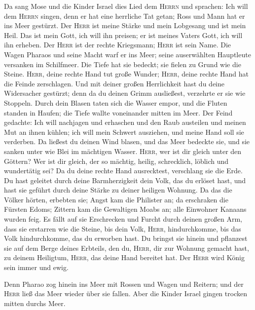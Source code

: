  Da sang Mose und die Kinder Israel dies Lied dem
\textsc{Herrn} und sprachen: Ich will dem \textsc{Herrn} singen, denn er
hat eine herrliche Tat getan; Ross und Mann hat er ins Meer gestürzt.
 Der \textsc{Herr} ist meine Stärke und mein Lobgesang und
ist mein Heil. Das ist mein Gott, ich will ihn preisen; er ist meines
Vaters Gott, ich will ihn erheben.  Der \textsc{Herr} ist
der rechte Kriegsmann; \textsc{Herr} ist sein Name.  Die
Wagen Pharaos und seine Macht warf er ins Meer; seine auserwählten
Hauptleute versanken im Schilfmeer.  Die Tiefe hat sie
bedeckt; sie fielen zu Grund wie die Steine. 
\textsc{Herr}, deine rechte Hand tut große Wunder; \textsc{Herr}, deine
rechte Hand hat die Feinde zerschlagen.  Und mit deiner
großen Herrlichkeit hast du deine Widersacher gestürzt; denn da du
deinen Grimm ausließest, verzehrte er sie wie Stoppeln. 
Durch dein Blasen taten sich die Wasser empor, und die Fluten standen in
Haufen; die Tiefe wallte voneinander mitten im Meer.  Der
Feind gedachte: Ich will nachjagen und erhaschen und den Raub austeilen
und meinen Mut an ihnen kühlen; ich will mein Schwert ausziehen, und
meine Hand soll sie verderben.  Da ließest du deinen Wind
blasen, und das Meer bedeckte sie, und sie sanken unter wie Blei im
mächtigen Wasser.  \textsc{Herr}, wer ist dir gleich
unter den Göttern? Wer ist dir gleich, der so mächtig, heilig,
schrecklich, löblich und wundertätig sei?  Da du deine
rechte Hand ausrecktest, verschlang sie die Erde.  Du
hast geleitet durch deine Barmherzigkeit dein Volk, das du erlöset hast,
und hast sie geführt durch deine Stärke zu deiner heiligen Wohnung.
 Da das die Völker hörten, erbebten sie; Angst kam die
Philister an;  da erschraken die Fürsten Edoms; Zittern
kam die Gewaltigen Moabs an; alle Einwohner Kanaans wurden feig.
 Es fällt auf sie Erschrecken und Furcht durch deinen
großen Arm, dass sie erstarren wie die Steine, bis dein Volk,
\textsc{Herr}, hindurchkomme, bis das Volk hindurchkomme, das du
erworben hast.  Du bringst sie hinein und pflanzest sie
auf dem Berge deines Erbteils, den du, \textsc{Herr}, dir zur Wohnung
gemacht hast, zu deinem Heiligtum, \textsc{Herr}, das deine Hand
bereitet hat.  Der \textsc{Herr} wird König sein immer
und ewig.

 Denn Pharao zog hinein ins Meer mit Rossen und Wagen und
Reitern; und der \textsc{Herr} ließ das Meer wieder über sie fallen.
Aber die Kinder Israel gingen trocken mitten durchs Meer.

